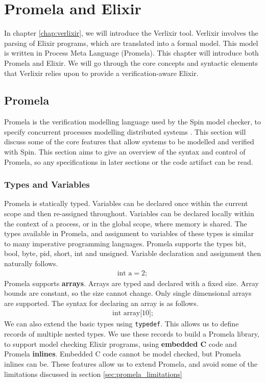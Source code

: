 \chapter{Promela and Elixir} \label{chap:promela_elixir}
In chapter \ref{chap:verlixir}, we will introduce the Verlixir tool. Verlixir involves the parsing of Elixir programs, which are translated into a formal model. This model is written in Process Meta Language (Promela). This chapter will introduce both Promela and Elixir. We will go through the core concepts and syntactic elements that Verlixir relies upon to provide a verification-aware Elixir. 
\section{Promela} \label{sec:promela}
Promela is the verification modelling language used by the Spin model checker, to specify concurrent processes modelling distributed systems \cite{spin}. This section will discuss some of the core features that allow systems to be modelled and verified with Spin. This section aims to give an overview of the syntax and control of Promela, so any specifications in later sections or the code artifact can be read.
\subsection{Types and Variables}
Promela is statically typed. Variables can be declared once within the current scope and then re-assigned throughout. Variables can be declared locally within the context of a process, or in the global scope, where memory is shared. The types available in Promela, and assignment to variables of these types is similar to many imperative programming languages. Promela supports the types bit, bool, byte, pid, short, int and unsigned. Variable declaration and assignment then naturally follows.
\[
\begin{aligned}
\text{int a} = 2;
\end{aligned}
\]
Promela supports \textbf{arrays}. Arrays are typed and declared with a fixed size. Array bounds are constant, so the size cannot change. Only single dimensional arrays are supported. The syntax for declaring an array is as follows.
\[
\begin{aligned}
\text{int array[10];}
\end{aligned}
\]
We can also extend the basic types using \texttt{typedef}. This allows us to define records of multiple nested types. We use these records to build a Promela library, to support model checking Elixir programs, using \textbf{embedded C} code and Promela \textbf{inlines}. Embedded C code cannot be model checked, but Promela inlines can be. These features allow us to extend Promela, and avoid some of the limitations discussed in section \ref{sec:promela_limitations} 
